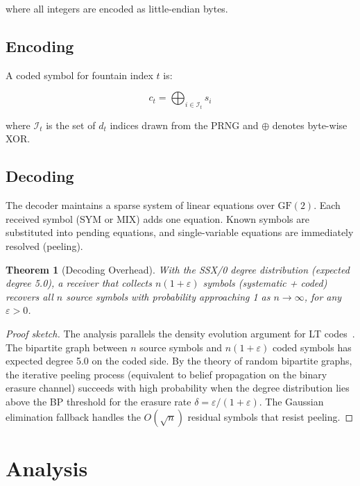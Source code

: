 \documentclass[11pt,twocolumn]{article}
\newtheorem{theorem}{Theorem}
\theoremstyle{definition}
\begin{document}
where all integers are encoded as little-endian bytes.

\subsection{Encoding}

A coded symbol for fountain index $t$ is:

\begin{equation}
  c_t = \bigoplus_{i \in \mathcal{I}_t} s_i
\end{equation}

where $\mathcal{I}_t$ is the set of $d_t$ indices drawn from the PRNG
and $\oplus$ denotes byte-wise XOR.

\subsection{Decoding}

The decoder maintains a sparse system of linear equations over
$\text{GF}(2)$. Each received symbol (SYM or MIX) adds one equation.
Known symbols are substituted into pending equations, and
single-variable equations are immediately resolved (peeling).

\begin{theorem}[Decoding Overhead]
\label{thm:overhead}
With the SSX/0 degree distribution (expected degree 5.0), a receiver
that collects $n(1 + \varepsilon)$ symbols (systematic + coded)
recovers all $n$ source symbols with probability approaching 1 as
$n \to \infty$, for any $\varepsilon > 0$.
\end{theorem}

\begin{proof}[Proof sketch]
The analysis parallels the density evolution argument for LT
codes~\cite{lt-codes}. The bipartite graph between $n$ source symbols
and $n(1+\varepsilon)$ coded symbols has expected degree 5.0 on the
coded side. By the theory of random bipartite graphs, the iterative
peeling process (equivalent to belief propagation on the binary erasure
channel) succeeds with high probability when the degree distribution
lies above the BP threshold for the erasure rate
$\delta = \varepsilon / (1 + \varepsilon)$. The Gaussian elimination
fallback handles the $O(\sqrt{n})$ residual symbols that resist peeling.
\end{proof}


\section{Analysis}
\label{sec:analysis}
\end{document}
